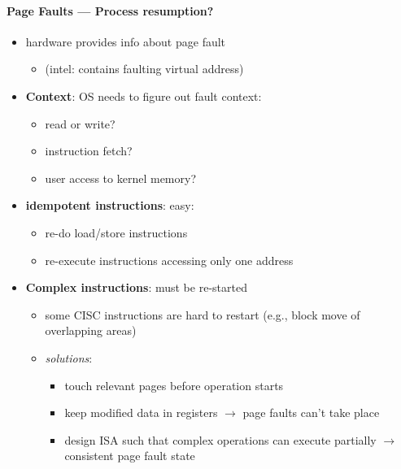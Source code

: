 \paragraph{Page Faults --- Process resumption?}
\begin{itemize}
  \item hardware provides info about page fault
  \begin{itemize}
    \item (intel:  contains faulting virtual address)
  \end{itemize}
  \item \textbf{Context}: OS needs to figure out fault context:
  \begin{itemize}
    \item read or write?
    \item instruction fetch?
    \item user access to kernel memory?
  \end{itemize}
  \item \textbf{idempotent instructions}: easy:
  \begin{itemize}
    \item re-do load/store instructions
    \item re-execute instructions accessing only one address
  \end{itemize}
  \item \textbf{Complex instructions}: must be re-started
  \begin{itemize}
    \item some CISC instructions are hard to restart (e.g., block move of overlapping areas)
    \item \emph{solutions}:
    \begin{itemize}
      \item touch relevant pages before operation starts
      \item keep modified data in registers $ \to $ page faults can't take place
      \item design ISA such that complex operations can execute partially $ \to $ consistent page fault state
    \end{itemize}
  \end{itemize}
\end{itemize}

